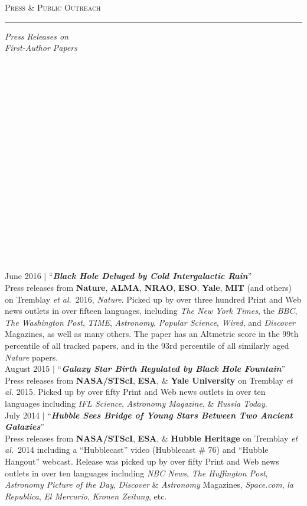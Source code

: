 \documentclass[11pt]{article}
\makeatletter
\def\vhrulefill#1{\leavevmode\leaders\hrule\@height#1\hfill \kern\z@}
\makeatother
\begin{document}
\clearpage

\textsc{Press \& Public Outreach} \vhrulefill{0.4pt}


\vspace{5mm}


\hspace{2.5mm} \parbox{1.5in}{\textit{Press Releases on \\ First-Author Papers \\ \\ \\ \\ \\  \\ \\ \\ \\ \\ \\ \\ \\ \\ \\ \\ \\ \\ \\  }}
\parbox{5.15in}{
June 2016 $|$ ``\textit{\textbf{Black Hole Deluged by Cold Intergalactic Rain}}'' \\ Press releases from \textbf{Nature}, \textbf{ALMA}, \textbf{NRAO}, \textbf{ESO}, \textbf{Yale}, \textbf{MIT} (and others) on Tremblay \textit{et al.}~2016, \textit{Nature}. Picked up by over three hundred Print and Web news outlets in over fifteen languages, including \textit{The New York Times}, the \textit{BBC}, \textit{The Washington Post}, \textit{TIME}, \textit{Astronomy}, \textit{Popular Science}, \textit{Wired}, and \textit{Discover} Magazines, as well as many others. The paper has an Altmetric score in the 99th percentile of all tracked papers, and in the 93rd percentile of all similarly aged \textit{Nature} papers.   \\


August 2015 $|$ ``\textit{\textbf{Galaxy Star Birth Regulated by Black Hole Fountain}}''\\
Press releases from \textbf{NASA/STScI}, \textbf{ESA}, \& \textbf{Yale University} on Tremblay \textit{et al.} 2015. Picked up by over fifty Print and Web news outlets in over ten languages including \textit{IFL Science}, \textit{Astronomy Magazine}, \& \textit{Russia Today}. \\

July 2014 $|$ ``\textbf{\textit{Hubble Sees Bridge of Young Stars Between Two Ancient Galaxies}}''\\ Press releases from \textbf{NASA/STScI}, \textbf{ESA}, \& \textbf{Hubble Heritage} on Tremblay \textit{et al.}~2014 including a ``Hubblecast'' video (Hubblecast \# 76) and ``Hubble Hangout'' webcast. Release was picked up by over fifty Print and Web news outlets in over ten languages including \textit{NBC News}, \textit{The Huffington Post}, \textit{Astronomy Picture of the Day}, \textit{Discover} \& \textit{Astronomy} Magazines, \textit{Space.com}, \textit{la Republica}, \textit{El Mercurio}, \textit{Kronen Zeitung}, etc. \\}
\end{document}
